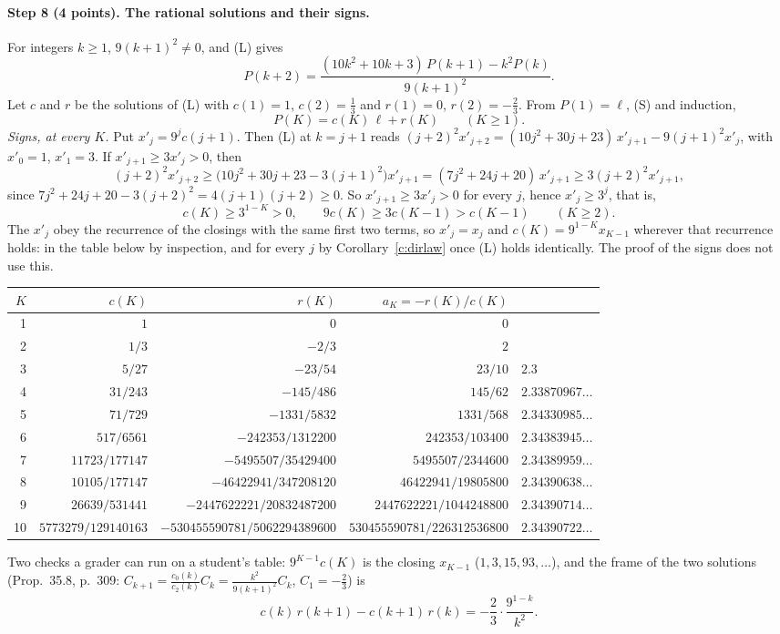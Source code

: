 \documentclass[11pt]{article}
\theoremstyle{plain}
\theoremstyle{definition}
\theoremstyle{remark}
\begin{document}
\paragraph{Step 8 (4 points). The rational solutions and their signs.}
For integers $k\ge1$, $9(k+1)^2\neq0$, and (L) gives
\[
P(k+2)=\frac{(10k^2+10k+3)\,P(k+1)-k^2P(k)}{9(k+1)^2}.
\]
Let $c$ and $r$ be the solutions of (L) with $c(1)=1$, $c(2)=\frac13$ and $r(1)=0$, $r(2)=-\frac23$. From $P(1)=\ell$, (S) and induction,
\[
P(K)=c(K)\,\ell+r(K)\qquad(K\ge1).
\]
\emph{Signs, at every $K$.} Put $x'_j=9^jc(j+1)$. Then (L) at $k=j+1$ reads $(j+2)^2x'_{j+2}=(10j^2+30j+23)\,x'_{j+1}-9(j+1)^2x'_j$, with $x'_0=1$, $x'_1=3$. If $x'_{j+1}\ge3x'_j>0$, then
\[
(j+2)^2x'_{j+2}\ge\big(10j^2+30j+23-3(j+1)^2\big)x'_{j+1}=(7j^2+24j+20)\,x'_{j+1}\ge3(j+2)^2x'_{j+1},
\]
since $7j^2+24j+20-3(j+2)^2=4(j+1)(j+2)\ge0$. So $x'_{j+1}\ge3x'_j>0$ for every $j$, hence $x'_j\ge3^j$, that is,
\[
c(K)\ge3^{1-K}>0,\qquad 9c(K)\ge3c(K-1)>c(K-1)\qquad(K\ge2).
\]
The $x'_j$ obey the recurrence of the closings with the same first two terms, so $x'_j=x_j$ and $c(K)=9^{1-K}x_{K-1}$ wherever that recurrence holds: in the table below by inspection, and for every $j$ by Corollary~\ref{c:dirlaw} once (L) holds identically. The proof of the signs does not use this.

\begin{center}
\small
\renewcommand{\arraystretch}{1.12}
\begin{tabular}{@{}r r r r l@{}}
\toprule
$K$ & $c(K)$ & $r(K)$ & $a_K=-r(K)/c(K)$ & \\ \midrule
1 & $1$ & $0$ & $0$ & \\
2 & $1/3$ & $-2/3$ & $2$ & \\
3 & $5/27$ & $-23/54$ & $23/10$ & $2.3$\\
4 & $31/243$ & $-145/486$ & $145/62$ & $2.33870967\ldots$\\
5 & $71/729$ & $-1331/5832$ & $1331/568$ & $2.34330985\ldots$\\
6 & $517/6561$ & $-242353/1312200$ & $242353/103400$ & $2.34383945\ldots$\\
7 & $11723/177147$ & $-5495507/35429400$ & $5495507/2344600$ & $2.34389959\ldots$\\
8 & $10105/177147$ & $-46422941/347208120$ & $46422941/19805800$ & $2.34390638\ldots$\\
9 & $26639/531441$ & $-2447622221/20832487200$ & $2447622221/1044248800$ & $2.34390714\ldots$\\
10 & $5773279/129140163$ & $-530455590781/5062294389600$ & $530455590781/226312536800$ & $2.34390722\ldots$\\
\bottomrule
\end{tabular}
\end{center}
Two checks a grader can run on a student's table: $9^{K-1}c(K)$ is the closing $x_{K-1}$ ($1,3,15,93,\dots$), and the frame of the two solutions (Prop.~35.8, p.~309: $C_{k+1}=\frac{c_0(k)}{c_2(k)}C_k=\frac{k^2}{9(k+1)^2}C_k$, $C_1=-\frac23$) is
\[
c(k)\,r(k+1)-c(k+1)\,r(k)=-\frac23\cdot\frac{9^{1-k}}{k^2} .
\]
\end{document}
